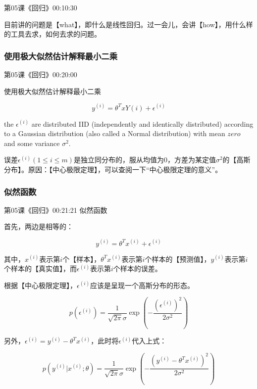 \documentclass[UTF8]{ctexbook}
\begin{document}
第05课《回归》00:10:30

目前讲的问题是【what】，即什么是线性回归。过一会儿，会讲【how】，用什么样的工具去求，如何去求的问题。

\subsubsection{使用极大似然估计解释最小二乘}

第05课《回归》00:20:00

使用极大似然估计解释最小二乘

\begin{displaymath}
y^{(i)}=\theta^{T}xY{(i)}+\epsilon^{(i)}
\end{displaymath}

the $\epsilon^{(i)}$ are distributed IID (independently and identically distributed) according to a Gaussian distribution (also called a Normal distribution) with mean $zero$ and some variance $\sigma^{2}$.

误差$\epsilon^{(i)}(1 \leq i \leq m)$是独立同分布的，服从均值为$0$，方差为某定值$\sigma^{2}$的【高斯分布】。原因：【中心极限定理】，可以查阅一下“中心极限定理的意义”。

\subsubsection{似然函数}

第05课《回归》00:21:21 似然函数

首先，两边是相等的：

\begin{displaymath}
y^{(i)}=\theta^{T}x^{(i)}+\epsilon^{(i)}
\end{displaymath}

其中，$x^{(i)}$表示第$i$个【样本】，$\theta^{T}x^{(i)}$表示第$i$个样本的【预测值】，$y^{(i)}$表示第$i$个样本的【真实值】，而$\epsilon^{(i)}$表示第$i$个样本的误差。

根据【中心极限定理】，$\epsilon^{(i)}$应该是呈现一个高斯分布的形态。

\begin{displaymath}
p(\epsilon^{(i)})=\frac{1}{\sqrt{2\pi}\sigma}\exp(-\frac{(\epsilon^{(i)})^{2}}{2\sigma^{2}})
\end{displaymath}

另外，$\epsilon^{(i)} = y^{(i)} - \theta^{T}x^{(i)}$，此时将$\epsilon^{(i)}$代入上式：

\begin{displaymath}
p(y^{(i)}|x^{(i)};\theta)=\frac{1}{\sqrt{2\pi}\sigma}\exp(-\frac{(y^{(i)} - \theta^{T}x^{(i)})^{2}}{2\sigma^{2}})
\end{displaymath}
\end{document}

